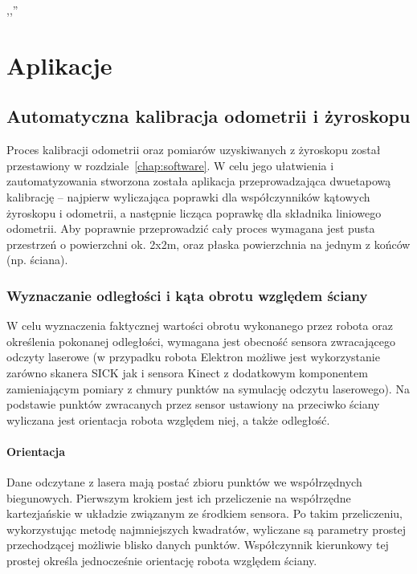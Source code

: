 

\begin{savequote}[70mm]
,,''
\qauthor{}
\end{savequote}


\chapter{Aplikacje}
\label{chap:aplikacje}

\section{Automatyczna kalibracja odometrii i żyroskopu}

Proces kalibracji odometrii oraz pomiarów uzyskiwanych z żyroskopu został
przestawiony w rozdziale~\ref{chap:software}. W celu jego ułatwienia i
zautomatyzowania stworzona została aplikacja przeprowadzająca dwuetapową
kalibrację -- najpierw wyliczająca poprawki dla współczynników kątowych
żyroskopu i odometrii, a następnie licząca poprawkę dla składnika liniowego
odometrii. Aby poprawnie przeprowadzić cały proces wymagana jest pusta
przestrzeń o powierzchni ok. 2x2m, oraz płaska powierzchnia na jednym z końców
(np. ściana).

\subsection{Wyznaczanie odległości i kąta obrotu względem ściany}

W celu wyznaczenia faktycznej wartości obrotu wykonanego przez robota oraz
określenia pokonanej odległości, wymagana jest obecność sensora zwracającego
odczyty laserowe (w przypadku robota Elektron możliwe jest wykorzystanie
zarówno skanera SICK jak i sensora Kinect z dodatkowym komponentem
zamieniającym pomiary z chmury punktów na symulację odczytu laserowego). Na
podstawie punktów zwracanych przez sensor ustawiony na przeciwko ściany
wyliczana jest orientacja robota względem niej, a także odległość.

\subsubsection{Orientacja}

Dane odczytane z lasera mają postać zbioru punktów we współrzędnych biegunowych.
Pierwszym krokiem jest ich przeliczenie na współrzędne kartezjańskie w układzie
związanym ze środkiem sensora. Po takim przeliczeniu, wykorzystując metodę
najmniejszych kwadratów, wyliczane są parametry prostej przechodzącej możliwie
blisko danych punktów. Współczynnik kierunkowy tej prostej określa jednocześnie
orientację robota względem ściany.


